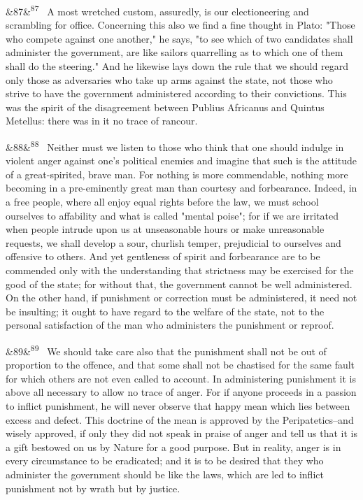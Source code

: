 \documentclass[12pt]{article}
\newcommand{\para}[1][]{\par\noindent\ifx&#1&\else\textsuperscript{\footnotesize #1}~\fi}
\begin{document}
\para[87] A most wretched custom, assuredly, is our electioneering and scrambling for office. Concerning this also we find a fine thought in Plato: "Those who compete against one another," he says, "to see which of two candidates shall administer the government, are like sailors quarrelling as to which one of them shall do the steering." And he likewise lays down the rule that we should regard only those as adversaries who take up arms against the state, not those who strive to have the government administered according to their convictions. This was the spirit of the disagreement between Publius Africanus and Quintus Metellus: there was in it no trace of rancour.

\para[88] Neither must we listen to those who think that one should indulge in violent anger against one's political enemies and imagine that such is the attitude of a great-spirited, brave man. For nothing is more commendable, nothing more becoming in a pre-eminently great man than courtesy and forbearance. Indeed, in a free people, where all enjoy equal rights before the law, we must school ourselves to affability and what is called "mental poise"; for if we are irritated when people intrude upon us at unseasonable hours or make unreasonable requests, we shall develop a sour, churlish temper, prejudicial to ourselves and offensive to others. And yet gentleness of spirit and forbearance are to be commended only with the understanding that strictness may be exercised for the good of the state; for without that, the government cannot be well administered. On the other hand, if punishment or correction must be administered, it need not be insulting; it ought to have regard to the welfare of the state, not to the personal satisfaction of the man who administers the punishment or reproof.

\para[89] We should take care also that the punishment shall not be out of proportion to the offence, and that some shall not be chastised for the same fault for which others are not even called to account. In administering punishment it is above all necessary to allow no trace of anger. For if anyone proceeds in a passion to inflict punishment, he will never observe that happy mean which lies between excess and defect. This doctrine of the mean is approved by the Peripatetics--and wisely approved, if only they did not speak in praise of anger and tell us that it is a gift bestowed on us by Nature for a good purpose. But in reality, anger is in every circumstance to be eradicated; and it is to be desired that they who administer the government should be like the laws, which are led to inflict punishment not by wrath but by justice.
\end{document}
